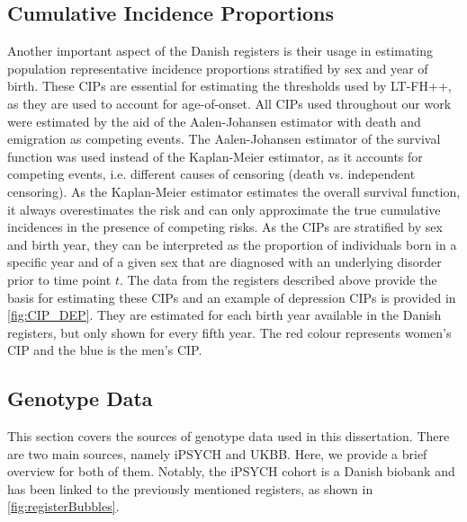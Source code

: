 \subsection{Cumulative Incidence Proportions} \label{sec:CIPs}
Another important aspect of the Danish registers is their usage in estimating population representative incidence proportions stratified by sex and year of birth. These CIPs are essential for estimating the thresholds used by LT-FH++, as they are used to account for age-of-onset. All CIPs used throughout our work were estimated by the aid of the Aalen-Johansen estimator with death and emigration as competing events\cite{andersen2012statistical,hansen2017estimating}. 
The Aalen-Johansen estimator of the survival function was used instead of the Kaplan-Meier estimator, as it accounts for competing events, i.e. different causes of censoring (death vs. independent censoring). As the Kaplan-Meier estimator estimates the overall survival function, it always overestimates the risk and can only approximate the true cumulative incidences in the presence of competing risks\cite{andersen2012competing}. As the CIPs are stratified by sex and birth year, they can be interpreted as the proportion of individuals born in a specific year and of a given sex that are diagnosed with an underlying disorder prior to time point $ t $. The data from the registers described above provide the basis for estimating these CIPs and an example of depression CIPs is provided in \cref{fig:CIP_DEP}. They are estimated for each birth year available in the Danish registers, but only shown for every fifth year. The red colour represents women's CIP and the blue is the men's CIP.


\subsection{Genotype Data}
This section covers the sources of genotype data used in this dissertation. There are two main sources, namely iPSYCH and UKBB. Here, we provide a brief overview for both of them. Notably, the iPSYCH cohort is a Danish biobank and has been linked to the previously mentioned registers, as shown in \cref{fig:registerBubbles}. 


